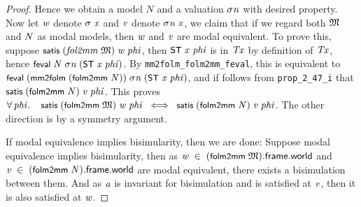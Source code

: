 \documentclass[letterpaper]{article}
\renewcommand{\HOLConst}[1]{{\textsf{\upshape\small #1}}}
\renewcommand{\HOLinline}[1]{\ensuremath{#1}}
\begin{document}
\begin{proof}
Hence we obtain a model $N$ and a valuation \HOLinline{\HOLFreeVar{\ensuremath{\sigma}n}} with desired property. Now let \HOLinline{\HOLFreeVar{w}} denote \HOLinline{\HOLFreeVar{\ensuremath{\sigma}}\;\HOLFreeVar{x}} and \HOLinline{\HOLFreeVar{v}} denote \HOLinline{\HOLFreeVar{\ensuremath{\sigma}n}\;\HOLFreeVar{x}}, we claim that if we regard both \HOLinline{\HOLFreeVar{\ensuremath{\mathfrak{M}}}} and \HOLinline{\HOLFreeVar{N}} as modal models, then \HOLinline{\HOLFreeVar{w}} and \HOLinline{\HOLFreeVar{v}} are modal equivalent. To prove this, suppose \HOLinline{\HOLConst{satis}\;(\HOLFreeVar{fol2mm}\;\HOLFreeVar{\ensuremath{\mathfrak{M}}})\;\HOLFreeVar{w}\;\HOLFreeVar{phi}}, then \HOLinline{\HOLConst{ST}\;\HOLFreeVar{x}\;\HOLFreeVar{phi}} is in \HOLinline{\HOLFreeVar{Tx}} by definition of \HOLinline{\HOLFreeVar{Tx}}, hence \HOLinline{\HOLConst{feval}\;\HOLFreeVar{N}\;\HOLFreeVar{\ensuremath{\sigma}n}\;(\HOLConst{ST}\;\HOLFreeVar{x}\;\HOLFreeVar{phi})}. By \texttt{mm2folm_folm2mm_feval}, this is equivalent to \HOLinline{\HOLConst{feval}\;(\HOLConst{mm2folm}\;(\HOLConst{folm2mm}\;\HOLFreeVar{N}))\;\HOLFreeVar{\ensuremath{\sigma}n}\;(\HOLConst{ST}\;\HOLFreeVar{x}\;\HOLFreeVar{phi})}, and if follows from \texttt{prop_2_47_i} that \HOLinline{\HOLConst{satis}\;(\HOLConst{folm2mm}\;\HOLFreeVar{N})\;\HOLFreeVar{v}\;\HOLFreeVar{phi}}. This proves \HOLinline{\HOLSymConst{\HOLTokenForall{}}\HOLBoundVar{phi}.\\
\;\;\;\;\HOLConst{satis}\;(\HOLConst{folm2mm}\;\HOLFreeVar{\ensuremath{\mathfrak{M}}})\;\HOLFreeVar{w}\;\HOLBoundVar{phi}\;\HOLSymConst{\HOLTokenEquiv{}}\;\HOLConst{satis}\;(\HOLConst{folm2mm}\;\HOLFreeVar{N})\;\HOLFreeVar{v}\;\HOLBoundVar{phi}}. The other direction is by a symmetry argument. 

If modal equivalence implies bisimularity, then we are done: Suppose modal equivalence implies bisimularity, then as \HOLinline{\HOLFreeVar{w}\;\HOLSymConst{\HOLTokenIn{}}\;(\HOLConst{folm2mm}\;\HOLFreeVar{\ensuremath{\mathfrak{M}}}).\HOLFieldName{frame}.\HOLFieldName{world}} and \HOLinline{\HOLFreeVar{v}\;\HOLSymConst{\HOLTokenIn{}}\;(\HOLConst{folm2mm}\;\HOLFreeVar{N}).\HOLFieldName{frame}.\HOLFieldName{world}} are modal equivalent, there exists a bisimulation between them. And as \HOLinline{\HOLFreeVar{a}} is invariant for bisimulation and is satisfied at \HOLinline{\HOLFreeVar{v}}, then it is also satisfied at \HOLinline{\HOLFreeVar{w}}. 


\end{proof}
\end{document}
